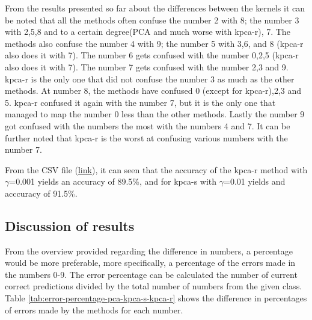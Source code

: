 From the results presented so far about the differences between the kernels it can be noted that all the methods often confuse the number 2 with 8; the number 3 with 2,5,8 and to a certain degree(PCA and much worse with \gls{kpca-r}), 7. The methods also confuse the number 4 with 9; the number 5 with 3,6, and 8 (\gls{kpca-r} also does it with 7). The number 6 gets confused with the number 0,2,5 (\gls{kpca-r} also does it with 7). The number 7 gets confused with the number 2,3 and 9. \gls{kpca-r} is the only one that did not confuse the number 3 as much as the other methods. At number 8, the methods have confused 0 (except for \gls{kpca-r}),2,3 and 5. \gls{kpca-r} confused it again with the number 7, but it is the only one that managed to map the number 0 less than the other methods. Lastly the number 9 got confused with the numbers the most with the numbers 4 and 7. It can be further noted that \gls{kpca-r} is the worst at confusing various numbers with the number 7.


From the CSV file (\href{https://github.com/AAU-Dat/P5-Nonlinear-Dimensionality-Reduction/blob/main/src/results/experiment_one/cross_validation_kernel_pca_svm_15000%20(1).csv}{link}), it can seen that the accuracy of the \gls{kpca-r} method with $\gamma$=0.001 yields an accuracy of 89.5\%, and for \gls{kpca-s} with $\gamma$=0.01 yields and acccuracy of 91.5\%.


\subsection{Discussion of results}
From the overview provided regarding the difference in numbers, a percentage would be more preferable, more specifically, a percentage of the errors made in the numbers 0-9. The error percentage can be calculated the number of current correct predictions divided by the total number of numbers from the given class. Table \ref{tab:error-percentage-pca-kpca-s-kpca-r} shows the difference in percentages of errors made by the methods for each number.

